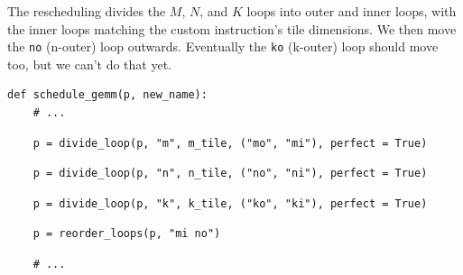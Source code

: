 \hfill
\begin{minipage}[t]{0.5\textwidth}\codeminipage
The rescheduling divides the $M$, $N$, and $K$ loops into outer and inner loops, with the inner loops matching the custom instruction's tile dimensions.
We then move the \texttt{no} (n-outer) loop outwards.
Eventually the \texttt{ko} (k-outer) loop should move too, but we can't do that yet.
\vspace{1cm}
\tiny
\begin{verbatim}
def schedule_gemm(p, new_name):
    # ...
\end{verbatim}
\begin{mdframed}[style=MyFrame, backgroundcolor=yellowBoxBg]
\color{yellowBoxFg}
\begin{verbatim}
    p = divide_loop(p, "m", m_tile, ("mo", "mi"), perfect = True)
\end{verbatim}
\end{mdframed}
\begin{mdframed}[style=MyFrame, backgroundcolor=greenBoxBg]
\color{greenBoxFg}
\begin{verbatim}
    p = divide_loop(p, "n", n_tile, ("no", "ni"), perfect = True)
\end{verbatim}
\end{mdframed}
\begin{mdframed}[style=MyFrame, backgroundcolor=violetBoxBg]
\color{violetBoxFg}
\begin{verbatim}
    p = divide_loop(p, "k", k_tile, ("ko", "ki"), perfect = True)
\end{verbatim}
\end{mdframed}
\begin{mdframed}[style=MyFrame, backgroundcolor=blueBoxBg]
\color{blueBoxFg}
\begin{verbatim}
    p = reorder_loops(p, "mi no")
\end{verbatim}
\end{mdframed}
\begin{verbatim}
    # ...
\end{verbatim}
\end{minipage}
\newpage
{}

